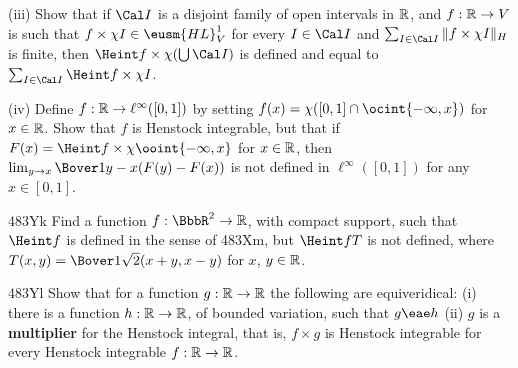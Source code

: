 {\quad(iii) Show that if $\Cal I$ is a disjoint family of open intervals
in $\Bbb R$, and $f:\Bbb R\to V$ is such that
$f\times\chi I\in\eusm{HL}^1_V$ for every $I\in\Cal I$ and
$\sum_{I\in\Cal I}\|f\times\chi I\|_H$ is finite, then
$\Heint f\times\chi(\bigcup\Cal I)$ is defined and equal to
$\sum_{I\in\Cal I}\Heint f\times\chi I$.

\quad(iv) Define $f:\Bbb R\to\ell^{\infty}([0,1])$ by setting
$f(x)=\chi([0,1]\cap\ocint{-\infty,x})$ for $x\in\Bbb R$.   Show that
$f$ is Henstock integrable, but that if
$F(x)=\Heint f\times\chi\ooint{-\infty,x}$ for $x\in\Bbb R$, then
$\lim_{y\to x}\Bover1{y-x}(F(y)-F(x))$ is not defined in
$\ell^{\infty}([0,1])$ for any $x\in[0,1]$.

\spheader 483Yk
Find a function $f:\BbbR^2\to\Bbb R$, with compact support, such that
$\Heint f$ is defined in the sense of 483Xm, but $\Heint fT$ is not
defined, where $T(x,y)=\Bover1{\sqrt2}(x+y,x-y)$ for $x$, $y\in\Bbb R$.

\spheader 483Yl
Show that for a function $g:\Bbb R\to\Bbb R$ the following are 
equiveridical:  (i) there is a function $h:\Bbb R\to\Bbb R$, of bounded 
variation, such that $g\eae h$ (ii) $g$ is a {\bf multiplier} for the 
Henstock integral, that is, $f\times g$ is Henstock integrable for every 
Henstock integrable $f:\Bbb R\to\Bbb R$.
}%

